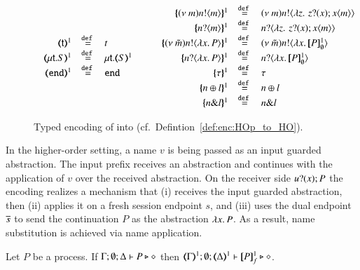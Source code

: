 \begin{figure}[h!]
\[\begin{array}{c}
\begin{array}{rcl}
			\tmap{\vart{t}}{1} &\defeq& {t}
			\\
			\tmap{\trec{t}{S}}{1} &\defeq& \trec{t}{\tmap{S}{1}}
			\\
			\tmap{\tinact}{1} &\defeq& \tinact
		\end{array}
		\qquad
		\begin{array}{rcl}
			\mapa{\news{m}\bactout{n}{m}}^{1} &\defeq&   \news{m}\bactout{n}{\abs{z}{\,\binp{z}{x} \appl{x}{m}} }
			\\
			\mapa{\bactinp{n}{m}}^{1} &\defeq&   \bactinp{n}{\abs{z}{\,\binp{z}{x} \appl{x}{m}} }
			\\

			\mapa{\news{\tilde{m}}\bactout{n}{\abs{x}{P}}}^{1} &\defeq& \news{\tilde{m}}\bactout{n}{\abs{x}{\pmapp{P}{1}{\es}}}
			\\
			\mapa{\bactinp{n}{\abs{x}{P}}}^{1} &\defeq& \bactinp{n}{\abs{x}{\pmapp{P}{1}{\es}}}
			\\
			\mapa{\tau}^{1} &\defeq& \tau
			\\
			\mapa{\bactsel{n}{l} }^{1} &\defeq& \bactsel{n}{l} 
			\\
			\mapa{\bactbra{n}{l} }^{1} &\defeq& \bactbra{n}{l} 
		\end{array}
	\end{array}
\]
	\caption{
		\label{fig:enc:HOp_to_HO}
		Typed encoding of \HOp into \HO (cf.~Defintion~\ref{def:enc:HOp_to_HO}).
	}
\end{figure}



In the higher-order setting, a name $v$ is being passed as an input
guarded abstraction. The input prefix receives an abstraction and
continues with the application of $v$ over the received abstraction.
On the receiver side $u ? (x) ; P$ 
the encoding realizes a mechanism that (i) receives
the input guarded abstraction, then (ii) applies it on a fresh session endpoint $s$, 
and (iii) uses
the dual endpoint $\overline{s}$ to send the continuation $P$ as the abstraction
$\lambda x.\,P$. 
As a result, name substitution is achieved via name application.


\begin{proposition}
	\label{prop:typepres_HOp_to_HO}
	Let $P$ be a \HOp process.
	If $\Gamma; \emptyset; \Delta \vdash P \triangleright \diamond$ then 
	$\mapt{\Gamma}^{1}; \emptyset; \mapt{\Delta}^{1} \proves \pmapp{P}{1}{f} \hastype \Proc$. 
\end{proposition}

